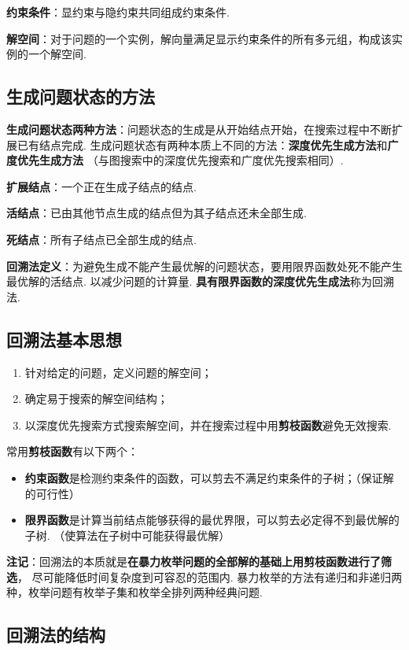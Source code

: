 \documentclass[12pt, a4paper, oneside]{ctexart}
\numberwithin{equation}{section}  %
\theoremstyle{definition}
\begin{document}
\textbf{约束条件}：显约束与隐约束共同组成约束条件.

\textbf{解空间}：对于问题的一个实例，解向量满足显示约束条件的所有多元组，构成该实例的一个解空间.

\subsection{生成问题状态的方法}
\textbf{生成问题状态两种方法}：问题状态的生成是从开始结点开始，在搜索过程中不断扩展已有结点完成. 
生成问题状态有两种本质上不同的方法：\textbf{深度优先生成方法}和\textbf{广度优先生成方法}
（与图搜索中的深度优先搜索和广度优先搜索相同）.

\textbf{扩展结点}：一个正在生成子结点的结点.

\textbf{活结点}：已由其他节点生成的结点但为其子结点还未全部生成.

\textbf{死结点}：所有子结点已全部生成的结点.

\textbf{回溯法定义}：为避免生成不能产生最优解的问题状态，要用限界函数处死不能产生最优解的活结点. 
以减少问题的计算量. \textbf{具有限界函数的深度优先生成法}称为回溯法.

\subsection{回溯法基本思想}
\begin{enumerate}
    \item 针对给定的问题，定义问题的解空间；
    \item 确定易于搜索的解空间结构；
    \item 以深度优先搜索方式搜索解空间，并在搜索过程中用\textbf{剪枝函数}避免无效搜索.
\end{enumerate}
常用\textbf{剪枝函数}有以下两个：
\begin{itemize}
    \item \textbf{约束函数}是检测约束条件的函数，可以剪去不满足约束条件的子树；（保证解的可行性）
    \item \textbf{限界函数}是计算当前结点能够获得的最优界限，可以剪去必定得不到最优解的子树. 
    （使算法在子树中可能获得最优解）
\end{itemize}
\textbf{注记}：回溯法的本质就是\textbf{在暴力枚举问题的全部解的基础上用剪枝函数进行了筛选}，
尽可能降低时间复杂度到可容忍的范围内. 
暴力枚举的方法有递归和非递归两种，枚举问题有枚举子集和枚举全排列两种经典问题.

\subsection{回溯法的结构}
\end{document}
